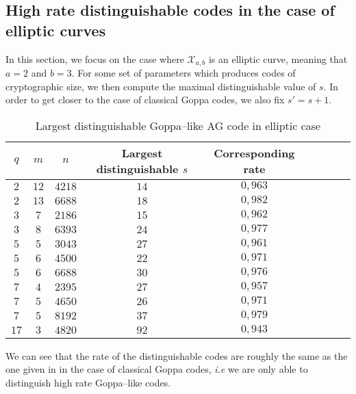 \documentclass[a4paper]{article}
\theoremstyle{definition}
\theoremstyle{remark}
\newcommand{\calX}{\mathcal{X}}
\begin{document}
\subsection{High rate distinguishable codes in the case of elliptic curves}


In this section, we focus on the case where $\calX_{a,b}$ is an elliptic curve, meaning that $a=2$ and $b=3$. For some set of parameters which produces codes of cryptographic size, we then compute the maximal distinguishable value of $s$. In order to get closer to the case of classical Goppa codes, we also fix $s'=s+1$.

\begin{table}[h]
\begin{center}
\begin{tabular}{|c|c|c||c|c|c|c|c|c|}
    \hline
    $q$ & $m$ & $n$ & Largest distinguishable $s$ & Corresponding rate\\
    \hline \hline
     $2$ & $12$ & $4218$ & $14$ & $0,963$ \\
    \hline 
     $2$ & $13$ & $6688$ & $18$ & $0,982$  \\
    \hline \hline
     $3$ & $7$ & $2186$ & $15$ & $0,962$ \\
    \hline
     $3$ & $8$ & $6393$ & $24$ & $0,977$ \\
    \hline \hline
     $5$ & $5$ & $3043$ & $27$ & $0,961$  \\
    \hline
     $5$ & $6$ & $4500$ & $22$ & $0,971$ \\
    \hline
     $5$  & $6$ & $6688$ & $30$ & $0,976$ \\
    \hline \hline
     $7$ & $4$ & $2395$ & $27$ & $0,957$ \\
    \hline
      $7$ & $5$ & $4650$ & $26$ & $0,971$ \\
    \hline
      $7$ & $5$ & $8192$ & $37$ & $0,979$ \\
    \hline \hline
      $17$ & $3$ & $4820$ & $92$ & $0,943$ \\
    \hline
\end{tabular}
\caption{Largest distinguishable Goppa--like AG code in elliptic case}
\end{center}
\end{table}

We can see that the rate of the distinguishable codes are roughly the same as the one given in \cite{MT21} in the case of classical Goppa codes, \emph{i.e} we are only able to distinguish high rate Goppa--like codes.
\end{document}
